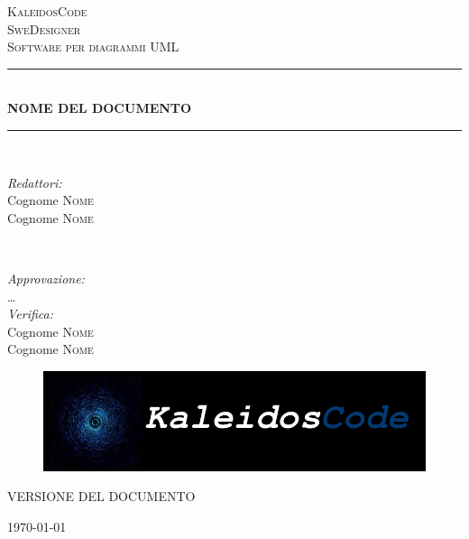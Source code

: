 \documentclass[a4paper]{report}
\begin{document}
	\begin{titlepage}
		\newcommand{\HRule}{\rule{\linewidth}{0.5mm}} 
		\center  
		
		\textsc{\LARGE KaleidosCode}\\[1.5cm] 
		\textsc{\Large SweDesigner}\\[0.5cm] 
		\textsc{\large Software per diagrammi UML}\\[0.5cm]
		
		
		\HRule \\[0.4cm]
		{ \huge \bfseries NOME DEL DOCUMENTO}\\[0.4cm] 
		\HRule \\[1.5cm]
		
		\begin{minipage}{0.4\textwidth}
			\begin{flushleft} \large
				\emph{Redattori:}\\
				Cognome \textsc{Nome} \\
				Cognome \textsc{Nome} \\
			\end{flushleft}
		\end{minipage}
		~
		\begin{minipage}{0.4\textwidth}
			\begin{flushright} \large
				\emph{Approvazione:} \\
				\dots \\
				\emph{Verifica:} \\
				Cognome \textsc{Nome} \\
				Cognome \textsc{Nome} \\
			\end{flushright}
		\end{minipage}
		
		\begin{figure}[H]
			\centering
			\includegraphics[width=\textwidth]{Figures/KaleidosCodeLogo.png}
		\end{figure}
		\begin{center}
			VERSIONE DEL DOCUMENTO
		\end{center}
		{\large \today}\\[3cm] 
		\vfill  
	\end{titlepage}
\end{document}
